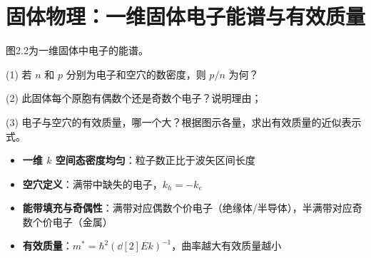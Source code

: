 \section{固体物理：一维固体电子能谱与有效质量}
\label{sec:1d-band-structure}

\begin{modelbox}[题目：一维固体中电子的能谱分析]
图2.2为一维固体中电子的能谱。

(1) 若 $n$ 和 $p$ 分别为电子和空穴的数密度，则 $p/n$ 为何？

(2) 此固体每个原胞有偶数个还是奇数个电子？说明理由；

(3) 电子与空穴的有效质量，哪一个大？根据图示各量，求出有效质量的近似表示式。
\end{modelbox}

\begin{tipbox}[考点快速分析]
\begin{itemize}
    \item \textbf{一维 $k$ 空间态密度均匀}：粒子数正比于波矢区间长度
    \item \textbf{空穴定义}：满带中缺失的电子，$k_h=-k_e$
    \item \textbf{能带填充与奇偶性}：满带对应偶数个价电子（绝缘体/半导体），半满带对应奇数个价电子（金属）
    \item \textbf{有效质量}：$m^*=\hbar^2\left(\dd[2]{E}{k}\right)^{-1}$，曲率越大有效质量越小
\end{itemize}
\end{tipbox}

